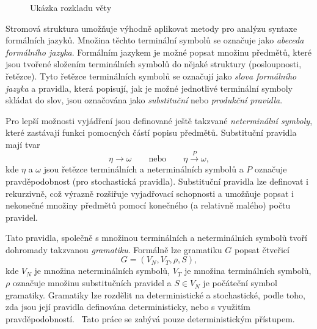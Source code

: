 \begin{figure}[H]
	\caption{Ukázka rozkladu věty}\label{fig:example_car_fix}
\end{figure}

Stromová struktura umožňuje výhodně aplikovat metody pro analýzu syntaxe formálních jazyků.
Množina těchto terminální symbolů se označuje jako \emph{abeceda formálního jazyka}.
Formálním jazykem je možné popsat množinu předmětů, které jsou tvořené složením terminálních symbolů do nějaké struktury (posloupnosti, řetězce).
Tyto řetězce terminálních symbolů se označují jako \emph{slova formálního jazyka} a pravidla,
která popisují, jak je možné jednotlivé terminální symboly skládat do slov, jsou označována jako \emph{substituční} nebo \emph{produkční pravidla}.

Pro lepší možnosti vyjádření jsou definované ještě takzvané \emph{neterminální symboly}, které zastávají funkci pomocných částí popisu předmětů.
Substituční pravidla mají tvar
\[
	\eta \to \omega \qquad \text{nebo} \qquad \eta \xrightarrow{P} \omega,
\]
kde $\eta$ a $\omega$ jsou řetězce terminálních a neterminálních symbolů a $P$ označuje pravděpodobnost (pro stochastická pravidla).
Substituční pravidla lze definovat i rekurzivně, což výrazně rozšiřuje vyjadřovací schopnosti a umožňuje popsat i nekonečné množiny předmětů
pomocí konečného (a relativně malého) počtu pravidel.~\cite{PsutkaJ_2006_Mluvimes}

Tato pravidla, společně s množinou terminálních a neterminálních symbolů tvoří dohromady takzvanou \emph{gramatiku}.
Formálně lze gramatiku $G$ popsat čtveřicí
\[
	G = (V_{N}, V_{T}, \rho, S),
\]
kde $V_{N}$ je množina neterminálních symbolů, $V_{T}$ je množina terminálních symbolů,
$\rho$ označuje množinu substitučních pravidel a $S \in V_{N}$ je počáteční symbol gramatiky.
Gramatiky lze rozdělit na deterministické a stochastické, podle toho, zda jsou její pravidla definována deterministicky,
nebo s využitím pravděpodobností.~\cite{PsutkaJ_2006_Mluvimes}
Tato práce se zabývá pouze deterministickým přístupem.

